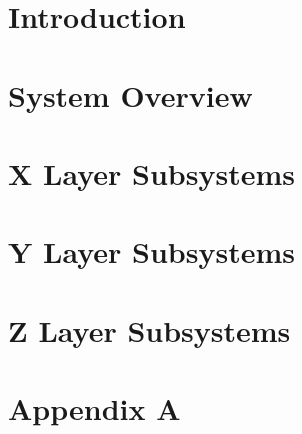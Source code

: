 \documentclass[11pt,letterpaper]{article}
\begin{document}
\setcounter{tocdepth}{2}
\tableofcontents
\newpage

\listoffigures
\listoftables
\newpage

\section{Introduction}

\section{System Overview}

\newpage
%
\newpage
\section{X Layer Subsystems}

\newpage
\section{Y Layer Subsystems}

\newpage
\section{Z Layer Subsystems}

\newpage
\section{Appendix A}

\newpage



{}
\end{document}
